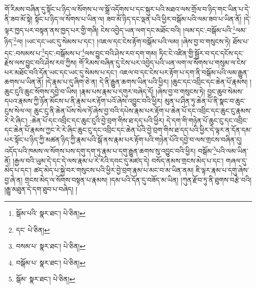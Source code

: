 གོ་རིམས་བཞིན་དུ་སྟོང་པ་ཉིད་ལ་སོགས་པ་ལ་སྒྲོ་འདོགས་པ་དང་སྐུར་པའི་མཐའ་ལས་གྲོལ་བ་ཉིད་གང་ཡིན་པ་དེ་ནི་ཟབ་མོ་སྟེ། སྟོང་པ་ཉིད་ལ་སོགས་པ་ཡིན་ལ། ཟབ་མོ་ཉིད་དང་ལྡན་པའི་ཕྱིར་བསྒོམ་པའི་ལམ་ཟབ་པ་ཡིན་ནོ། །དེ་ལྟར་ཁྱད་པར་བསྟན་ནས་ཁྱད་པར་གྱི་གཞི། ངེས་འབྱེད་ཡན་ལག་དང་མཐོང་བའི། །ལམ་དང་:བསྒོམ་པའི་\footnote{སྒོམ་པའི་  སྣར་ཐང་།  པེ་ཅིན། }ལམ་ཉིད་\footnote{དང་  པེ་ཅིན། }ལ། །ཡང་དང་ཡང་དུ་སེམས་པ་དང་། །འཇལ་དང་ངེས་རྟོག་བསྒོམ་པའི་ལམ། །ཞེས་བྱ་བ་གསུངས་ཏེ། ཐོས་པ་དང་:བསམས་པ་\footnote{བསམ་པ་  སྣར་ཐང་།  པེ་ཅིན། }དང་:བསྒོམས་པ་\footnote{བསྒོམ་པ་  སྣར་ཐང་།  པེ་ཅིན། }ལས་བྱུང་བའི་ཤེས་རབ་དག་གམ། ཏིང་ངེ་འཛིན་གྱི་སྦྱོར་བ་དང་དངོས་དང་རྗེས་ལས་བྱུང་བའི་ཤེས་རབ་ཀྱིས། གོ་རིམས་བཞིན་དུ་ངེས་པར་འབྱེད་པའི་ཡན་ལག་ལ་སོགས་པ་གསུམ་ལ་ངེས་པར་མཐོང་བའི་དོན་ཡང་དང་ཡང་དུ་སེམས་པ་དང་། འཇལ་བ་དང་ངེས་པར་རྟོག་པ་དག་ནི་བསྒོམ་པའི་ལམ་རྒྱུན་ཆགས་པ་ཡིན་ནོ། །དེ་རྣམ་པ་དུ་ཞིག་ཅེ་ན། དེ་ནི་རྒྱུན་ཆགས་ཡིན་པའི་ཕྱིར། །ཆུང་དང་འབྲིང་དང་ཆེན་པོ་རྣམས། །ཆུང་ངུའི་ཆུང་སོགས་དབྱེ་བ་ཡིས། །རྣམ་པས་རྣམ་པ་དགུར་བཞེད་དོ། །ཞེས་བྱ་བ་གསུངས་ཏེ། བྱང་ཆུབ་སེམས་དཔའ་རྣམས་ཀྱི་ཉོན་མོངས་པ་ནི་རྣམ་པར་རྟོག་པའོ་ཞེས་འབྱུང་བའི་ཕྱིར། མུན་པ་ཤིན་ཏུ་ཆེན་པོ་ནི་སྣང་བ་ཆུང་ངུས་སེལ་ལ། ཆུང་ངུ་ནི་ཆེན་པོས་སེལ་ཏོ་ཞེས་བྱ་བའི་དཔེས་རྣམ་པར་རྟོག་པ་ཆེན་པོ་དང་འབྲིང་དང་ཆུང་ངུ་རྣམས་རེ་རེ་ཞིང་། :ཆེན་པོ་དང་འབྲིང་དང་ཆུང་ངུའི་བྱེ་བྲག་གིས་ཐ་དད་པའི་ཕྱིར། དེ་དག་གི་གཉེན་པོ་ཆུང་ངུ་དང་འབྲིང་དང་ཆེན་པོ་རྣམས་ཀྱང་རེ་རེ་ཞིང་ཆུང་ངུ་དང་འབྲིང་དང་ཆེན་པོའི་བྱེ་བྲག་གིས་ཐ་དད་པའི་ཕྱིར་དེ་ལྟར་ན་དོན་དམ་པར་སྟོང་པ་ཉིད་ཀྱི་མཚན་ཉིད་ཀྱི་རྣམ་པའི་སྒོ་ནས་རྣམ་པར་རྟོག་པའི་གཉེན་པོའི་དབྱེ་བ་ལས་གྲངས་བཞིན་དུ། འདོད་པའི་ཁམས་ལ་སོགས་པས་དགུ་དག་ཏུ་རྣམ་པ་དགུ་རྒྱུན་ཆགས་སུ་འབྱུང་བའི་ཕྱིར། བསྒོམ་\footnote{སྒོམ་  སྣར་ཐང་།  པེ་ཅིན། }པའི་ལམ་ཡིན་ནོ། །རྒྱལ་བའི་ཡུམ་དེ་དང་དེ་ལས་རྣམ་པ་རེ་རེའི་དབང་དུ་མཛད་དེ། བསོད་ནམས་གྲངས་མེད་པ་དང་། གཞལ་དུ་མེད་པ་དང་། ཚད་མེད་པ་སྐྱེ་བར་གསུངས་པའི་ཕྱིར་བྱེ་བྲག་རྣམ་པ་མང་བ་མ་ཡིན་ནམ། ཇི་ལྟར་རྣམ་པ་དགུ་ཞེས་བྱ་ཞེ་ན། གྲངས་མེད་ལ་སོགས་བསྟན་པ་རྣམས། །དམ་པའི་དོན་དུ་བཟོད་མ་ཡིན། །ཀུན་རྫོབ་ཏུ་ནི་ཐུགས་བརྩེ་བའི། །རྒྱུ་མཐུན་དེ་དག་ཐུབ་པ་བཞེད། །
